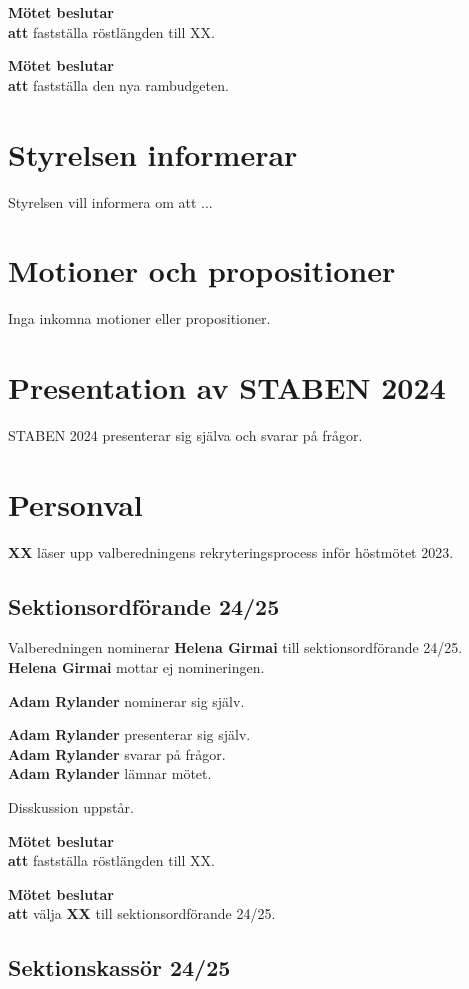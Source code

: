 \documentclass{datateknologsektionen-document}
\newcommand{\ind}{\hspace*{2em}}
\newcommand{\motetbeslutar}{\textbf{Mötet beslutar}}
\newcommand{\att}{\\\ind\textbf{att}}
\begin{document}
\motetbeslutar
\att{} fastställa röstlängden till XX.

\motetbeslutar
\att{} fastställa den nya rambudgeten.


\section{Styrelsen informerar}
Styrelsen vill informera om att ...


\section{Motioner och propositioner}

Inga inkomna motioner eller propositioner.


\section{Presentation av STABEN 2024}

STABEN 2024 presenterar sig själva och svarar på frågor.

\pagebreak
\section{Personval}

\textbf{XX} läser upp valberedningens rekryteringsprocess inför höstmötet 2023.

\subsection{Sektionsordförande 24/25}
Valberedningen nominerar \textbf{Helena Girmai} till sektionsordförande 24/25. \\
\textbf{Helena Girmai} mottar ej nomineringen.

\textbf{Adam Rylander} nominerar sig själv.

\textbf{Adam Rylander} presenterar sig själv.\\
\textbf{Adam Rylander} svarar på frågor.\\
\textbf{Adam Rylander} lämnar mötet.

Disskussion uppstår.

\motetbeslutar
\att{} fastställa röstlängden till XX.

\motetbeslutar
\att{} välja \textbf{XX} till sektionsordförande 24/25.

\subsection{Sektionskassör 24/25}
\end{document}
